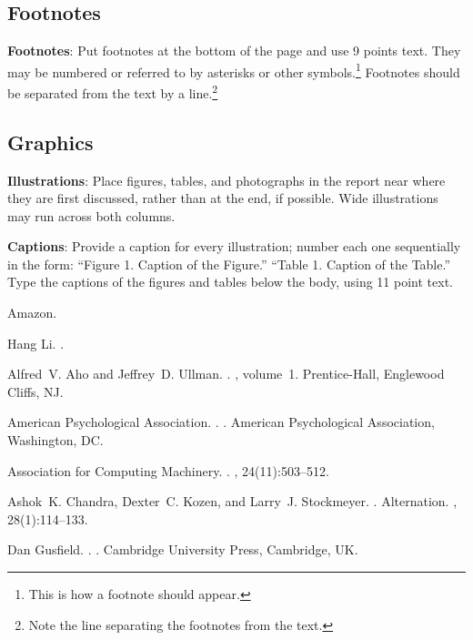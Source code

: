 \documentclass[11pt]{article}
\begin{document}
\subsection{Footnotes}

{\bf Footnotes}: Put footnotes at the bottom of the page and use 9
points text. They may be numbered or referred to by asterisks or other
symbols.\footnote{This is how a footnote should appear.} Footnotes
should be separated from the text by a line.\footnote{Note the line
separating the footnotes from the text.}

\subsection{Graphics}

{\bf Illustrations}: Place figures, tables, and photographs in the
report near where they are first discussed, rather than at the end, if
possible.  Wide illustrations may run across both columns.

{\bf Captions}: Provide a caption for every illustration; number each one
sequentially in the form:  ``Figure 1. Caption of the Figure.'' ``Table 1.
Caption of the Table.''  Type the captions of the figures and 
tables below the body, using 11 point text.

\begin{thebibliography}{}

Amazon.

Hang Li.
.

Alfred~V. Aho and Jeffrey~D. Ullman.
.
, volume~1.
\newblock Prentice-{Hall}, Englewood Cliffs, NJ.

{American Psychological Association}.
.
.
\newblock American Psychological Association, Washington, DC.

{Association for Computing Machinery}.
.
, 24(11):503--512.

Ashok~K. Chandra, Dexter~C. Kozen, and Larry~J. Stockmeyer.
.
\newblock Alternation.
,
  28(1):114--133.

Dan Gusfield.
.
.
\newblock Cambridge University Press, Cambridge, UK.

\end{thebibliography}
\end{document}
